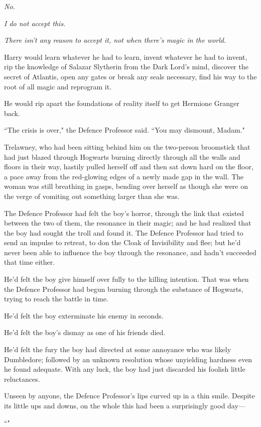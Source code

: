 \emph{No.}

\emph{I do not accept this.}

\emph{There isn't any reason to accept it, not when there's magic in the world.}

Harry would learn whatever he had to learn, invent whatever he had to invent, rip the knowledge of Salazar Slytherin from the Dark Lord's mind, discover the secret of Atlantis, open any gates or break any seals necessary, find his way to the root of all magic and reprogram it.

He would rip apart the foundations of reality itself to get Hermione Granger back.

\later

``The crisis is over," the Defence Professor said. ``You may dismount, Madam."

Trelawney, who had been sitting behind him on the two-person broomstick that had just blazed through Hogwarts burning directly through all the walls and floors in their way, hastily pulled herself off and then sat down hard on the floor, a pace away from the red-glowing edges of a newly made gap in the wall. The woman was still breathing in gasps, bending over herself as though she were on the verge of vomiting out something larger than she was.

The Defence Professor had felt the boy's horror, through the link that existed between the two of them, the resonance in their magic; and he had realized that the boy had sought the troll and found it. The Defence Professor had tried to send an impulse to retreat, to don the Cloak of Invisibility and flee; but he'd never been able to influence the boy through the resonance, and hadn't succeeded that time either.

He'd felt the boy give himself over fully to the killing intention. That was when the Defence Professor had begun burning through the substance of Hogwarts, trying to reach the battle in time.

He'd felt the boy exterminate his enemy in seconds.

He'd felt the boy's dismay as one of his friends died.

He'd felt the fury the boy had directed at some annoyance who was likely Dumbledore; followed by an unknown resolution whose unyielding hardness even he found adequate. With any luck, the boy had just discarded his foolish little reluctances.

Unseen by anyone, the Defence Professor's lips curved up in a thin smile. Despite its little ups and downs, on the whole this had been a surprisingly good day—

``"

